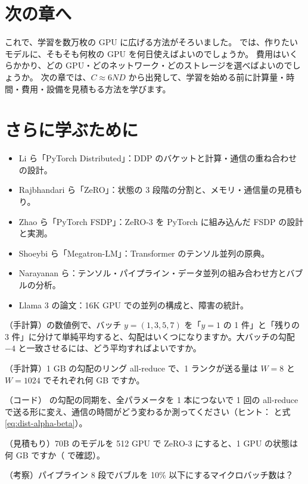 \section*{次の章へ}
これで、学習を数万枚の GPU に広げる方法がそろいました。
では、作りたいモデルに、そもそも何枚の GPU を何日使えばよいのでしょうか。
費用はいくらかかり、どの GPU・どのネットワーク・どのストレージを選べばよいのでしょうか。
次の章では、$C\approx 6ND$ から出発して、学習を始める前に計算量・時間・費用・設備を見積もる方法を学びます。

\section*{さらに学ぶために}
\begin{itemize}
\item Li ら「PyTorch Distributed」\cite{li2020pytorch}：DDP のバケットと計算・通信の重ね合わせの設計。
\item Rajbhandari ら「ZeRO」\cite{rajbhandari2020zero}：状態の 3 段階の分割と、メモリ・通信量の見積もり。
\item Zhao ら「PyTorch FSDP」\cite{zhao2023pytorch}：ZeRO-3 を PyTorch に組み込んだ FSDP の設計と実測。
\item Shoeybi ら「Megatron-LM」\cite{shoeybi2019megatron}：Transformer のテンソル並列の原典。
\item Narayanan ら\cite{narayanan2021efficient}：テンソル・パイプライン・データ並列の組み合わせ方とバブルの分析。
\item Llama 3 の論文\cite{dubey2024llama3}：16K GPU での並列の構成と、障害の統計。
\end{itemize}

\begin{exercises}
\item （手計算）の数値例で、バッチ $y=(1,3,5,7)$ を「$y=1$ の 1 件」と「残りの 3 件」に分けて単純平均すると、勾配はいくつになりますか。大バッチの勾配 $-4$ と一致させるには、どう平均すればよいですか。
\item （手計算）1 GB の勾配のリング all-reduce で、1 ランクが送る量は $W=8$ と $W=1024$ でそれぞれ何 GB ですか。
\item （コード） の勾配の同期を、全パラメータを 1 本につないで 1 回の all-reduce で送る形に変え、通信の時間がどう変わるか測ってください（ヒント： と式\eqref{eq:dist-alpha-beta}）。
\item （見積もり）70B のモデルを 512 GPU で ZeRO-3 にすると、1 GPU の状態は何 GB ですか（ で確認）。
\item （考察）パイプライン 8 段でバブルを 10\% 以下にするマイクロバッチ数は？
\end{exercises}
